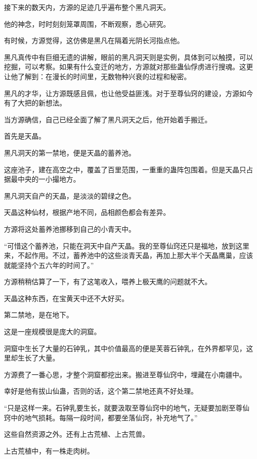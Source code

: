
\begin{this_body}

接下来的数天内，方源的足迹几乎遍布整个黑凡洞天。

他的神念，时时刻刻笼罩周围，不断观察，悉心研究。

有时候，方源觉得，这仿佛是黑凡在隔着光阴长河指点他。

黑凡真传中有巨细无遗的讲解，眼前的黑凡洞天则是实例，具体到可以触摸，可以挖掘，可以考察。如果有什么变迁的地方，方源就对那些蛊仙俘虏进行搜魂。这更让他了解到：在漫长的时间里，无数物种兴衰的过程和秘密。

黑凡的才华，让方源既感且佩，也让他受益匪浅。对于至尊仙窍的建设，方源如今有了大把的新想法。

当方源确信，自己已经全面了解了黑凡洞天之后，他开始着手搬迁。

首先是天晶。

黑凡洞天的第一禁地，便是天晶的蓄养池。

这座池子，建在高空之中，覆盖了百里范围，一重重的蛊阵包围着。但是天晶只占据最中央的一小撮地方。

黑凡洞天自产的天晶，是淡淡的碧绿之色。

天晶这种仙材，根据产地不同，品相颜色都会有差异。

方源将这处蓄养池挪移到自己的小青天中。

“可惜这个蓄养池，只能在洞天中自产天晶。我的至尊仙窍还只是福地，放到这里来，不起作用。不过，蓄养池中的这些淡青天晶，再加上那大半个天晶鹰巢，应该就能坚持个五六年的时间了。”

方源稍稍估算了一下，有了这笔收入，喂养上极天鹰的问题就不大。

天晶这种东西，在宝黄天中还不大好买。

第二禁地，是在地下。

这是一座规模很是庞大的洞窟。

洞窟中生长了大量的石钟乳，其中价值最高的便是芙蓉石钟乳，在外界都罕见，这里却生长了大量。

方源费了一番心思，才整个洞窟都挖出来。搬进至尊仙窍中，埋藏在小南疆中。

幸好是他有拔山仙蛊，否则的话，这个第二禁地还真不好处理。

“只是这样一来。石钟乳要生长，就要汲取至尊仙窍中的地气，无疑要加剧至尊仙窍中的地气损耗。每隔一段时间，都要坐落仙窍，补充地气了。”

这些自然资源之外。还有上古荒植、上古荒兽。

上古荒植中，有一株走肉树。


\end{this_body}
